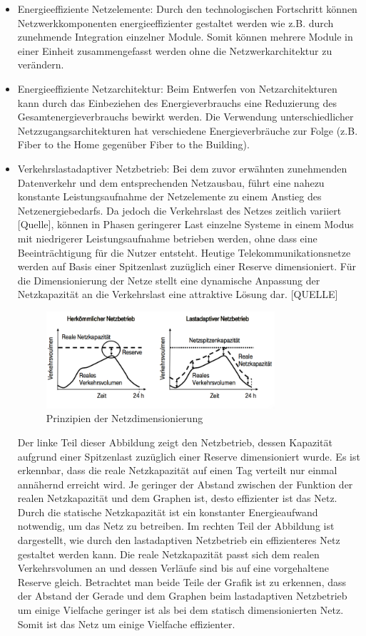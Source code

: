 \documentclass[12pt,titlepage]{article}
\begin{document}
\begin{itemize}
	\item Energieeffiziente Netzelemente: Durch den technologischen Fortschritt können Netzwerkkomponenten energieeffizienter gestaltet werden wie z.B. durch zunehmende Integration einzelner Module. Somit können mehrere Module in einer Einheit zusammengefasst werden ohne die Netzwerkarchitektur zu verändern. 
	\item Energieeffiziente Netzarchitektur: Beim Entwerfen von Netzarchitekturen kann durch das Einbeziehen des Energieverbrauchs eine Reduzierung des Gesamtenergieverbrauchs bewirkt werden.  Die Verwendung unterschiedlicher Netzzugangsarchitekturen hat verschiedene Energieverbräuche zur Folge (z.B. Fiber to the Home gegenüber Fiber to the Building).
	\item Verkehrslastadaptiver Netzbetrieb: Bei dem zuvor erwähnten zunehmenden Datenverkehr und dem entsprechenden Netzausbau, führt eine nahezu konstante Leistungsaufnahme der Netzelemente zu einem Anstieg des Netzenergiebedarfs. Da jedoch die Verkehrslast des Netzes zeitlich variiert [Quelle], können in Phasen geringerer Last einzelne Systeme in einem Modus mit niedrigerer Leistungsaufnahme betrieben werden, ohne dass eine Beeinträchtigung für die Nutzer entsteht. Heutige Telekommunikationsnetze werden auf Basis einer Spitzenlast zuzüglich einer Reserve dimensioniert. Für die Dimensionierung der Netze stellt eine dynamische Anpassung der Netzkapazität an die Verkehrslast eine attraktive Lösung dar. [QUELLE]
\begin{figure}[!]
	\centering
	\includegraphics[width=0.8\textwidth]{Netzdimensionierung}
	\caption{Prinzipien der Netzdimensionierung}
	\label{fig:Netzdimensionierung}
\end{figure}
Der linke Teil dieser Abbildung zeigt den Netzbetrieb, dessen Kapazität aufgrund einer Spitzenlast zuzüglich einer Reserve dimensioniert wurde. Es ist erkennbar, dass die reale Netzkapazität auf einen Tag verteilt nur einmal annähernd erreicht wird. Je geringer der Abstand zwischen der Funktion der realen Netzkapazität und dem Graphen ist, desto effizienter ist das Netz. Durch die statische Netzkapazität ist ein konstanter Energieaufwand notwendig, um das Netz zu betreiben. Im rechten Teil der Abbildung ist dargestellt, wie durch den lastadaptiven Netzbetrieb ein effizienteres Netz gestaltet werden kann. Die reale Netzkapazität passt sich dem realen Verkehrsvolumen an und dessen Verläufe sind bis auf eine vorgehaltene Reserve gleich. Betrachtet man beide Teile der Grafik ist zu erkennen, dass der Abstand der Gerade und dem Graphen beim lastadaptiven Netzbetrieb um einige Vielfache geringer ist als bei dem statisch dimensionierten Netz. Somit ist das Netz um einige Vielfache effizienter. 
\end{itemize}
\end{document}
